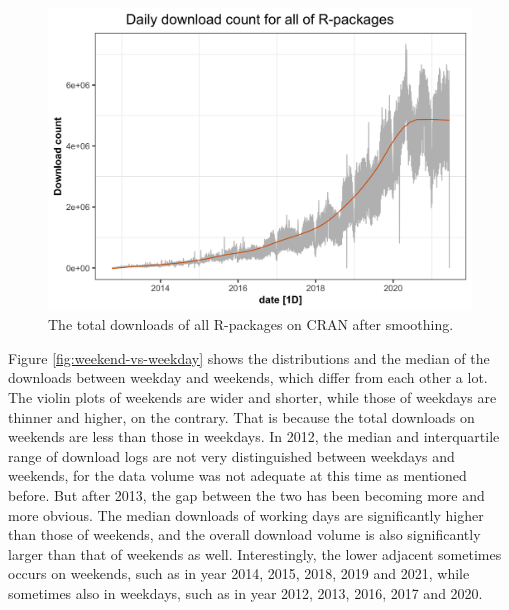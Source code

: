 \documentclass[
]{book}
\begin{document}
\begin{figure}

{\centering \includegraphics{figures/pkg-stl-1} 

}

\caption{The total downloads of all R-packages on CRAN after smoothing.}\label{fig:pkg-stl}
\end{figure}

Figure \ref{fig:weekend-vs-weekday} shows the distributions and the median of the downloads between weekday and weekends, which differ from each other a lot. The violin plots of weekends are wider and shorter, while those of weekdays are thinner and higher, on the contrary. That is because the total downloads on weekends are less than those in weekdays. In 2012, the median and interquartile range of download logs are not very distinguished between weekdays and weekends, for the data volume was not adequate at this time as mentioned before. But after 2013, the gap between the two has been becoming more and more obvious. The median downloads of working days are significantly higher than those of weekends, and the overall download volume is also significantly larger than that of weekends as well. Interestingly, the lower adjacent sometimes occurs on weekends, such as in year 2014, 2015, 2018, 2019 and 2021, while sometimes also in weekdays, such as in year 2012, 2013, 2016, 2017 and 2020.
\end{document}
